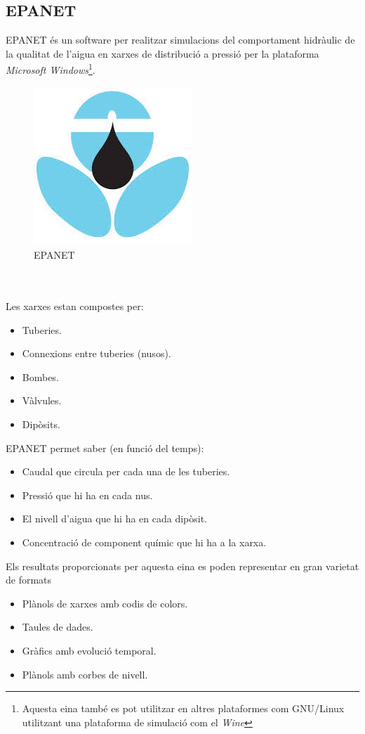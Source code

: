 \documentclass[12pt]{article}
\begin{document}
\subsection{EPANET}
EPANET és un software per realitzar simulacions del comportament hidràulic de la qualitat de l'aigua en xarxes de distribució a pressió per la plataforma \textit{Microsoft Windows}\footnote{Aquesta eina també es pot utilitzar en altres plataformes com GNU/Linux utilitzant una plataforma de simulació com el \textit{Wine}}.
\begin{figure}[h!]
	\centering
	\includegraphics[scale=0.5]{imatges/epanet.jpeg}
	\caption{EPANET}
\end{figure}
\\\\Les xarxes estan compostes per:
\begin{itemize}
	\item Tuberies.
	\item Connexions entre tuberies (nusos).
	\item Bombes.
	\item Vàlvules.
	\item Dipòsits.
\end{itemize}
\vspace{0.5cm}EPANET permet saber (en funció del temps):
\begin{itemize}
	\item Caudal que circula per cada una de les tuberies.
	\item Pressió que hi ha en cada nus.
	\item El nivell d'aigua que hi ha en cada dipòsit.
	\item Concentració de component químic que hi ha a la xarxa.
\end{itemize}
\vspace{0.5cm}Els resultats proporcionats per aquesta eina es poden representar en gran varietat de formats
\begin{itemize}
	\item Plànols de xarxes amb codis de colors.
	\item Taules de dades.
	\item Gràfics amb evolució temporal.
	\item Plànols amb corbes de nivell.
\end{itemize}
\end{document}

